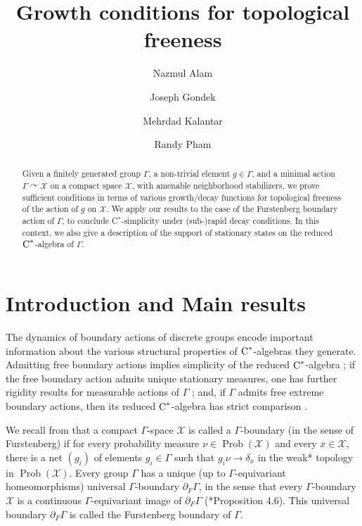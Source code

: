 \documentclass[12pt]{amsart}
\title[]{Growth conditions for topological freeness}
\author[N. Alam]{Nazmul Alam}
\author[J. Gondek]{Joseph Gondek}
\author[M. Kalantar]{Mehrdad Kalantar}
\author[R. Pham]{Randy Pham}
\date{}
\theoremstyle{definition}
\theoremstyle{remark}
\newcommand{\pr}{\operatorname{Prob}}
\newcommand{\act}{\curvearrowright}
\newcommand{\cX}{\mathcal{X}}
\newcommand{\G}{\Gamma}
\begin{document}
\begin{abstract}
Given a finitely generated group $\G$, a non-trivial element $g\in \G$, and a minimal action $\G\act \mathcal{X}$ on a compact space $\mathcal{X}$, with amenable neighborhood stabilizers, we prove sufficient conditions in terms of various growth/decay functions for topological freeness of the action of $g$ on $\mathcal{X}$. We apply our results to the case of the Furstenberg boundary action of $\G$, to conclude \textup{C}$^*$-simplicity under (sub-)rapid decay conditions. In this context, we also give a description of the support of stationary states on the reduced $\textup{C}^*$-algebra of $\G$.
\end{abstract}

\maketitle






\section{Introduction and Main results} 

\let\thefootnote\relax{}


The dynamics of boundary actions of discrete groups encode important information about the various structural properties of $\textup{C}^*$-algebras they generate. Admitting free boundary actions implies simplicity of the reduced $\textup{C}^*$-algebra \cite{KK14}; if the free boundary action admits unique stationary measures, one has further rigidity results for measurable actions of $\G$ \cite{hart-kalantar-1}; and, if $\G$ admits free extreme boundary actions, then its reduced $\textup{C}^*$-algebra has strict comparison \cite{Oz25}. 

We recall from \cite{Furstenberg73} that a compact $\G$-space $\cX$ is called a $\G$-boundary (in the sense of Furstenberg) if for every probability measure $\nu\in \pr(\cX)$ and every $x\in \mathcal{X}$, there is a net $(g_i)$ of elements $g_i\in \G$ such that $g_i\nu\to \delta_x$ in the weak* topology in $\pr(\cX)$.
Every group $\G$ has a unique (up to $\G$-equivariant homeomorphisms) universal $\G$-boundary $\partial_F\G$, in the sense that every $\G$-boundary $\cX$ is a continuous $\G$-equivariant image of $\partial_F\G$ (\cite{Furstenberg73}*{Proposition 4.6}). This universal boundary $\partial_F\G$ is called the Furstenberg boundary of $\G$. 
\end{document}
